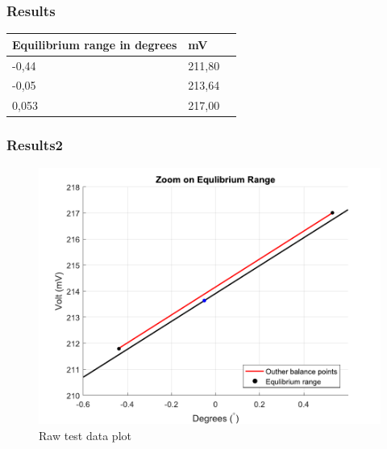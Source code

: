 \subsubsection{Results}
\begin{table}[H]
	\begin{tabular}{|l|l|p{4.3cm}|}
		\hline%
		\textbf{Equilibrium range in degrees}       &  \textbf{mV}         \\
		\hline%
		-0,44                               			  & 211,80               \\
		\hline%
		-0,05                                          & 213,64               \\
		\hline%
		0,053 										  & 217,00              \\
		\hline%
	\end{tabular}
\end{table}

\subsubsection{Results2}
\begin{figure}[H] 
	\centering 
	\includegraphics[scale=0.7]{figures/linearityOfPotmeterTest2-2}
	\caption{Raw test data plot}
	\label{linearityOfPotmeterTest2-2}
\end{figure}